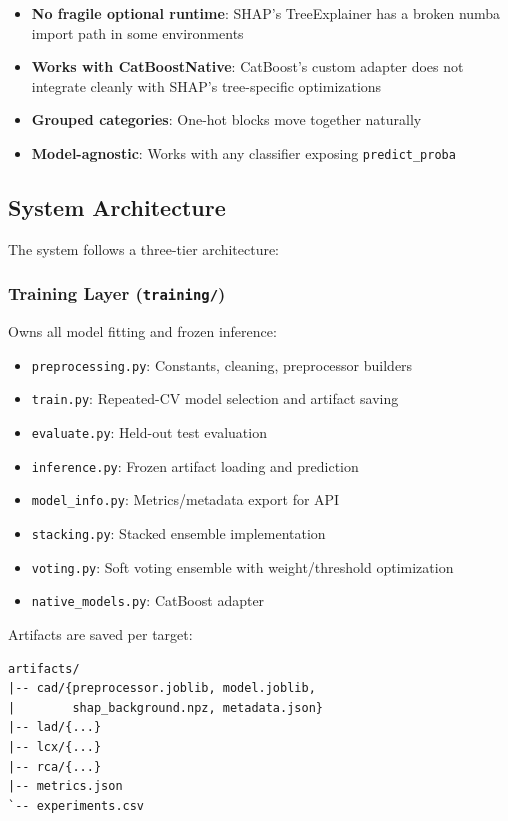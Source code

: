\documentclass[conference]{IEEEtran}
\begin{document}
\begin{itemize}
    \item \textbf{No fragile optional runtime}: SHAP's TreeExplainer has a broken numba import path in some environments
    \item \textbf{Works with CatBoostNative}: CatBoost's custom adapter does not integrate cleanly with SHAP's tree-specific optimizations
    \item \textbf{Grouped categories}: One-hot blocks move together naturally
    \item \textbf{Model-agnostic}: Works with any classifier exposing \texttt{predict\_proba}
\end{itemize}

\subsection{System Architecture}

The system follows a three-tier architecture:

\subsubsection{Training Layer (\texttt{training/})}

Owns all model fitting and frozen inference:
\begin{itemize}
    \item \texttt{preprocessing.py}: Constants, cleaning, preprocessor builders
    \item \texttt{train.py}: Repeated-CV model selection and artifact saving
    \item \texttt{evaluate.py}: Held-out test evaluation
    \item \texttt{inference.py}: Frozen artifact loading and prediction
    \item \texttt{model\_info.py}: Metrics/metadata export for API
    \item \texttt{stacking.py}: Stacked ensemble implementation
    \item \texttt{voting.py}: Soft voting ensemble with weight/threshold optimization
    \item \texttt{native\_models.py}: CatBoost adapter
\end{itemize}

Artifacts are saved per target:
\begin{footnotesize}
\begin{verbatim}
artifacts/
|-- cad/{preprocessor.joblib, model.joblib,
|        shap_background.npz, metadata.json}
|-- lad/{...}
|-- lcx/{...}
|-- rca/{...}
|-- metrics.json
`-- experiments.csv
\end{verbatim}
\end{footnotesize}
\end{document}
